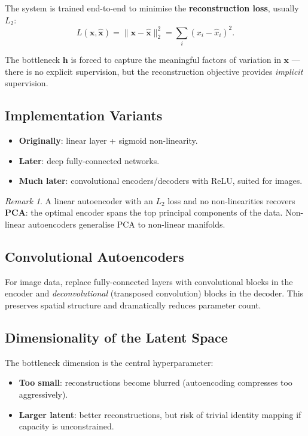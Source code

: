 \documentclass[11pt,a4paper]{article}
\theoremstyle{definition}
\theoremstyle{plain}
\theoremstyle{remark}
\newtheorem*{remark}{Remark}
\begin{document}
The system is trained end-to-end to minimise the \textbf{reconstruction loss}, usually $L_2$:
\[
    L(\mathbf{x}, \hat{\mathbf{x}}) = \|\mathbf{x} - \hat{\mathbf{x}}\|_2^2 = \sum_i (x_i - \hat{x}_i)^2.
\]

The bottleneck $\mathbf{h}$ is forced to capture the meaningful factors of variation in $\mathbf{x}$ --- there is no explicit supervision, but the reconstruction objective provides \emph{implicit} supervision.

\subsection{Implementation Variants}

\begin{itemize}
    \item \textbf{Originally}: linear layer + sigmoid non-linearity.
    \item \textbf{Later}: deep fully-connected networks.
    \item \textbf{Much later}: convolutional encoders/decoders with ReLU, suited for images.
\end{itemize}

\begin{remark}
A linear autoencoder with an $L_2$ loss and no non-linearities recovers \textbf{PCA}: the optimal encoder spans the top principal components of the data. Non-linear autoencoders generalise PCA to non-linear manifolds.
\end{remark}

\subsection{Convolutional Autoencoders}

For image data, replace fully-connected layers with convolutional blocks in the encoder and \emph{deconvolutional} (transposed convolution) blocks in the decoder. This preserves spatial structure and dramatically reduces parameter count.

\subsection{Dimensionality of the Latent Space}

The bottleneck dimension is the central hyperparameter:
\begin{itemize}
    \item \textbf{Too small}: reconstructions become blurred (autoencoding compresses too aggressively).
    \item \textbf{Larger latent}: better reconstructions, but risk of trivial identity mapping if capacity is unconstrained.
\end{itemize}
\end{document}
